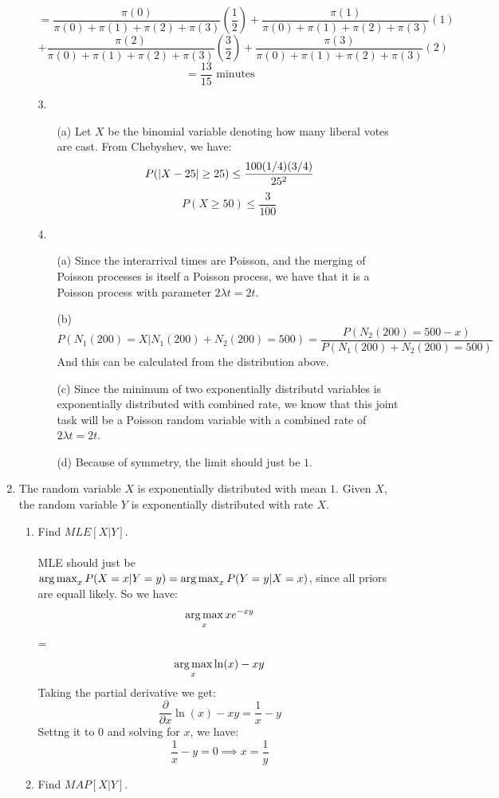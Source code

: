 \begin{enumerate}
\begin{enumerate}
        $$=\frac{\pi(0)}{\pi(0) + \pi(1) + \pi(2) + \pi(3)}(\frac{1}{2}) + \frac{\pi(1)}{\pi(0) + \pi(1) + \pi(2) + \pi(3)}(1)$$
        $$+ \frac{\pi(2)}{\pi(0) + \pi(1) + \pi(2) + \pi(3)}(\frac{3}{2}) + \frac{\pi(3)}{\pi(0) + \pi(1) + \pi(2) + \pi(3)}(2)$$
        $$=\frac{13}{15} \text{ minutes}$$
      \item [3.]
        \begin{enumerate}
          \item [(a)] 
            Let $X$ be the binomial variable denoting how many liberal votes are cast. From Chebyshev, we have:
            $$P(\left\vert X - 25 \right\vert \geq 25) \leq \frac{100(1/4)(3/4)}{25^2}$$
            $$P(X \geq 50) \leq \frac{3}{100}$$
        \end{enumerate}
      \item [4.]
        \begin{enumerate}
          \item [(a)]
            Since the interarrival times are Poisson, and the merging of Poisson processes is itself a Poisson process, we have that it is a Poisson process with parameter $2 \lambda t= 2t$.
          \item [(b)]
            $$P(N_1(200) = X | N_1(200) + N_2(200) = 500) = \frac{P(N_2(200) = 500-x)}{P(N_1(200) + N_2(200) = 500)}$$
            And this can be calculated from the distribution above.
          \item [(c)]
            Since the minimum of two exponentially distributd variables is exponentially distributed with combined rate, we know that this joint task will be a Poisson random variable with a combined rate of $2 \lambda t= 2t$.
          \item [(d)]
            Because of symmetry, the limit should just be $1$.
        \end{enumerate}
    \end{enumerate}
  \item The random variable $X$ is exponentially distributed with mean $1$. Given $X$, the random variable $Y$ is exponentially distributed with rate $X$.
    \begin{enumerate}
      \item Find $MLE[X|Y]$.\\\\

        MLE should just be $\operatorname*{arg\,max}_x P(X=x|Y=y) = \operatorname*{arg\,max}_x P(Y=y|X=x)$, since all priors are equall likely. So we have:
        $$\operatorname*{arg\,max}_x xe^{-xy}$$
        =$$\operatorname*{arg\,max}_x \ln(x) - xy$$
        Taking the partial derivative we get:
        $$\frac{\partial}{\partial x} \ln(x) - xy = \frac{1}{x} - y$$
        Settng it to $0$ and solving for $x$, we have:
        $$\frac{1}{x} - y = 0 \implies x = \frac{1}{y}$$
      \item Find $MAP[X|Y]$.\\\\


\end{enumerate}
\end{enumerate}
